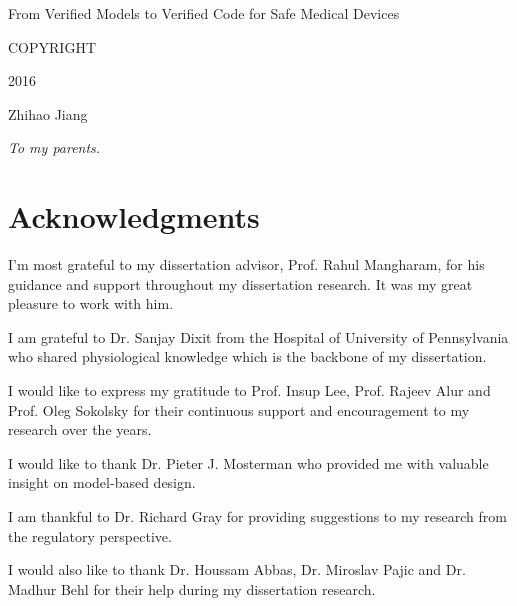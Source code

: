 \documentclass[12pt,letterpaper]{report}
\theoremstyle{definition}
\theoremstyle{remark}
\numberwithin{equation}{chapter}
\theoremstyle{plain} %
\def\theauthor{Zhihao Jiang}
\def\theyear{2016}
\begin{document}
\newpage
\thispagestyle{empty}
\vspace*{\fill}
\begin{center}
From Verified Models to Verified Code for Safe Medical Devices

\vspace*{0.6 in}
COPYRIGHT

\vspace*{0.6 in}
\theyear

\vspace*{0.6 in}
\theauthor
\end{center}
\vspace*{\fill}


\newpage
\begin{center}
\vspace*{\fill}
\it{To my parents.}
\vspace*{\fill}
\end{center}


\newpage
{}
{}
\chapter*{Acknowledgments}
%
I'm most grateful to my dissertation advisor, Prof. Rahul Mangharam, for his guidance and support throughout my dissertation research.
It was my great pleasure to work with him.

I am grateful to Dr. Sanjay Dixit from the Hospital of University of Pennsylvania who shared physiological knowledge which is the backbone of my dissertation.

I would like to express my gratitude to Prof. Insup Lee, Prof. Rajeev Alur and Prof. Oleg Sokolsky for their continuous support and encouragement to my research over the years.

I would like to thank Dr. Pieter J. Mosterman who provided me with valuable insight on model-based design.

I am thankful to Dr. Richard Gray for providing suggestions to my research from the regulatory perspective.

I would also like to thank Dr. Houssam Abbas, Dr. Miroslav Pajic and Dr. Madhur Behl for their help during my dissertation research.
\end{document}
